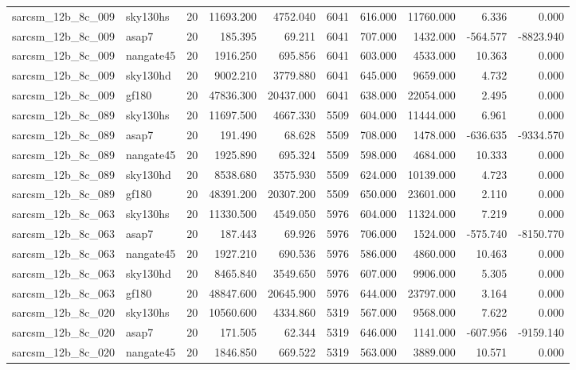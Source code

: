 \begin{longtable}{llrrrrrrrr}
sarcsm\_12b\_8c\_009 & sky130hs & 20 & 11693.200 & 4752.040 & 6041 & 616.000 & 11760.000 & 6.336 & 0.000 \\
sarcsm\_12b\_8c\_009 & asap7 & 20 & 185.395 & 69.211 & 6041 & 707.000 & 1432.000 & -564.577 & -8823.940 \\
sarcsm\_12b\_8c\_009 & nangate45 & 20 & 1916.250 & 695.856 & 6041 & 603.000 & 4533.000 & 10.363 & 0.000 \\
sarcsm\_12b\_8c\_009 & sky130hd & 20 & 9002.210 & 3779.880 & 6041 & 645.000 & 9659.000 & 4.732 & 0.000 \\
sarcsm\_12b\_8c\_009 & gf180 & 20 & 47836.300 & 20437.000 & 6041 & 638.000 & 22054.000 & 2.495 & 0.000 \\
sarcsm\_12b\_8c\_089 & sky130hs & 20 & 11697.500 & 4667.330 & 5509 & 604.000 & 11444.000 & 6.961 & 0.000 \\
sarcsm\_12b\_8c\_089 & asap7 & 20 & 191.490 & 68.628 & 5509 & 708.000 & 1478.000 & -636.635 & -9334.570 \\
sarcsm\_12b\_8c\_089 & nangate45 & 20 & 1925.890 & 695.324 & 5509 & 598.000 & 4684.000 & 10.333 & 0.000 \\
sarcsm\_12b\_8c\_089 & sky130hd & 20 & 8538.680 & 3575.930 & 5509 & 624.000 & 10139.000 & 4.723 & 0.000 \\
sarcsm\_12b\_8c\_089 & gf180 & 20 & 48391.200 & 20307.200 & 5509 & 650.000 & 23601.000 & 2.110 & 0.000 \\
sarcsm\_12b\_8c\_063 & sky130hs & 20 & 11330.500 & 4549.050 & 5976 & 604.000 & 11324.000 & 7.219 & 0.000 \\
sarcsm\_12b\_8c\_063 & asap7 & 20 & 187.443 & 69.926 & 5976 & 706.000 & 1524.000 & -575.740 & -8150.770 \\
sarcsm\_12b\_8c\_063 & nangate45 & 20 & 1927.210 & 690.536 & 5976 & 586.000 & 4860.000 & 10.463 & 0.000 \\
sarcsm\_12b\_8c\_063 & sky130hd & 20 & 8465.840 & 3549.650 & 5976 & 607.000 & 9906.000 & 5.305 & 0.000 \\
sarcsm\_12b\_8c\_063 & gf180 & 20 & 48847.600 & 20645.900 & 5976 & 644.000 & 23797.000 & 3.164 & 0.000 \\
sarcsm\_12b\_8c\_020 & sky130hs & 20 & 10560.600 & 4334.860 & 5319 & 567.000 & 9568.000 & 7.622 & 0.000 \\
sarcsm\_12b\_8c\_020 & asap7 & 20 & 171.505 & 62.344 & 5319 & 646.000 & 1141.000 & -607.956 & -9159.140 \\
sarcsm\_12b\_8c\_020 & nangate45 & 20 & 1846.850 & 669.522 & 5319 & 563.000 & 3889.000 & 10.571 & 0.000 \\

\end{longtable}
